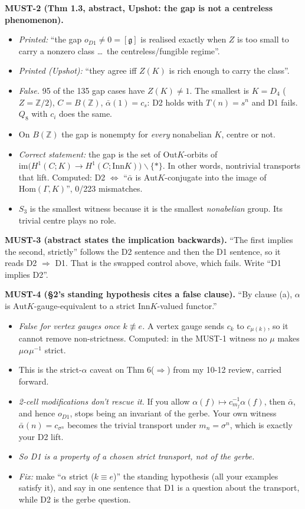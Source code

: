 \documentclass[10pt]{article}
\newcommand{\Z}{\mathbb{Z}}
\newcommand{\Inn}{\mathrm{Inn}}\newcommand{\Out}{\mathrm{Out}}\newcommand{\Aut}{\mathrm{Aut}}
\begin{document}
\textbf{MUST-2 (Thm 1.3, abstract, Upshot: the gap is not a centreless phenomenon).}
\begin{itemize}
\item \emph{Printed:} ``the gap $o_{D1}\neq0=[\mathfrak g]$ is realised exactly when $Z$ is too small to carry a nonzero class \dots\ the centreless/fungible regime''.
\item \emph{Printed (Upshot):} ``they agree iff $Z(K)$ is rich enough to carry the class''.
\item \emph{False.} 95 of the 135 gap cases have $Z(K)\ne1$. The smallest is $K=D_4$ ($Z=\Z/2$), $C=B(\Z)$, $\bar\alpha(1)=c_s$: D2 holds with $T(n)=s^n$ and D1 fails. $Q_8$ with $c_i$ does the same.
\item On $B(\Z)$ the gap is nonempty for \emph{every} nonabelian $K$, centre or not.
\item \emph{Correct statement:} the gap is the set of $\Out K$-orbits of $\mathrm{im}\big(H^1(C;K)\to H^1(C;\Inn K)\big)\smallsetminus\{*\}$. In other words, nontrivial transports that lift. Computed: D2 $\iff$ ``$\bar\alpha$ is $\Aut K$-conjugate into the image of $\mathrm{Hom}(\Gamma,K)$'', 0/223 mismatches.
\item $S_3$ is the smallest witness because it is the smallest \emph{nonabelian} group. Its trivial centre plays no role.
\end{itemize}

\textbf{MUST-3 (abstract states the implication backwards).} ``The first implies the second, strictly'' follows the D2 sentence and then the D1 sentence, so it reads D2 $\Rightarrow$ D1. That is the swapped control above, which fails. Write ``D1 implies D2''.

\textbf{MUST-4 (\S2's standing hypothesis cites a false clause).} ``By clause (a), $\alpha$ is $\Aut K$-gauge-equivalent to a strict $\Inn K$-valued functor.''
\begin{itemize}
\item \emph{False for vertex gauges once $k\not\equiv e$.} A vertex gauge sends $c_k$ to $c_{\mu(k)}$, so it cannot remove non-strictness. Computed: in the MUST-1 witness no $\mu$ makes $\mu\alpha\mu^{-1}$ strict.
\item This is the strict-$\alpha$ caveat on Thm 6($\Rightarrow$) from my 10-12 review, carried forward.
\item \emph{2-cell modifications don't rescue it.} If you allow $\alpha(f)\mapsto c_{m_f}^{-1}\alpha(f)$, then $\bar\alpha$, and hence $o_{D1}$, stops being an invariant of the gerbe. Your own witness $\bar\alpha(n)=c_{\sigma^n}$ becomes the trivial transport under $m_n=\sigma^n$, which is exactly your D2 lift.
\item \emph{So D1 is a property of a chosen strict transport, not of the gerbe.}
\item \emph{Fix:} make ``$\alpha$ strict ($k\equiv e$)'' the standing hypothesis (all your examples satisfy it), and say in one sentence that D1 is a question about the transport, while D2 is the gerbe question.
\end{itemize}
\end{document}
